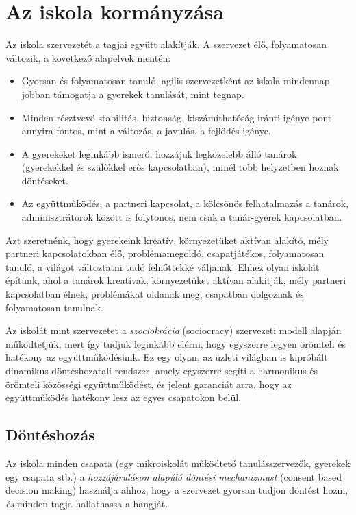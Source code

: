 \section{Az iskola kormányzása}
\label{sec:az_iskola_kormanyzasa}
Az iskola szervezetét a tagjai együtt alakítják. A szervezet élő, folyamatosan változik, a következő alapelvek mentén:

\begin{itemize}

  \item
        Gyorsan és folyamatosan tanuló, agilis szervezetként az iskola minden\-nap jobban támogatja a gyerekek tanulását, mint tegnap.
  \item
        Minden résztvevő stabilitás, biztonság, kiszámíthatóság iránti igénye pont annyira fontos, mint a változás, a javulás, a fejlődés igénye.
  \item
        A gyerekeket leginkább ismerő, hozzájuk legközelebb álló tanárok (gyerekekkel és szülőkkel erős kapcsolatban), minél több helyzetben hoznak döntéseket.
  \item
        Az együttműködés, a partneri kapcsolat, a kölcsönös felhatalmazás a tanárok, adminisztrátorok között is folytonos, nem csak a tanár-gyerek kapcsolatban.
\end{itemize}

Azt szeretnénk, hogy gyerekeink kreatív, környezetüket aktívan alakító, mély partneri kapcsolatokban élő, problémamegoldó, csapatjátékos, folyamatosan tanuló, a világot változtatni tudó felnőttekké váljanak. Ehhez olyan iskolát építünk, ahol a tanárok kreatívak, környezetüket aktívan alakítják, mély partneri kapcsolatban élnek, problémákat oldanak meg, csapatban dolgoznak és folyamatosan tanulnak.

Az iskolát mint szervezetet a \emph{szociokrácia} (sociocracy) szervezeti modell alapján működtetjük, mert így tudjuk leginkább elérni, hogy egyszerre legyen örömteli és hatékony az együttműködésünk. Ez egy olyan, az üzleti világban is kipróbált dinamikus döntéshozatali rendszer, amely egyszerre segíti a harmonikus és örömteli közösségi együttműködést, és jelent garanciát arra, hogy az együttműködés hatékony lesz az egyes csapatokon belül.

\subsection{Döntéshozás}
\label{sec:consent_based}

Az iskola minden csapata (egy mikroiskolát működtető tanulásszervezők, gyerekek egy csapata stb.) a \emph{hozzájáruláson alapúló döntési mechanizmust} (consent based decision making) használja ahhoz, hogy a szervezet gyorsan tudjon döntést hozni, \emph{és} minden tagja hallathassa a hangját.

